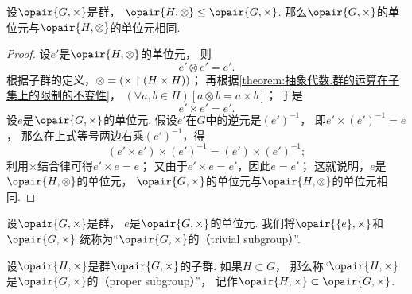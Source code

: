 \begin{proposition}\label{theorem:抽象代数.子群.群的单位元与其子群的单位元相同}
设\(\opair{G,\times}\)是群，
\(\opair{H,\otimes}\AlgebraSubstructure\opair{G,\times}\).
那么\(\opair{G,\times}\)的单位元与\(\opair{H,\otimes}\)的单位元相同.
\begin{proof}
设\(e'\)是\(\opair{H,\otimes}\)的单位元，
则\begin{equation*}
	e' \otimes e' = e'.
\end{equation*}
根据子群的定义，\(\otimes = (\times \upharpoonright(H \times H))\)；
再根据\cref{theorem:抽象代数.群的运算在子集上的限制的不变性}，
\((\forall a,b \in H)[a \otimes b = a \times b]\)；
于是\begin{equation*}
	e' \times e' = e'.
\end{equation*}
设\(e\)是\(\opair{G,\times}\)的单位元.
假设\(e'\)在\(G\)中的逆元是\((e')^{-1}\)，
即\(e' \times (e')^{-1} = e\)，
那么在上式等号两边右乘\((e')^{-1}\)，得\begin{equation*}
	(e' \times e') \times (e')^{-1} = (e') \times (e')^{-1};
\end{equation*}
利用\(\times\)结合律可得\(e' \times e = e\)；
又由于\(e' \times e = e'\)，因此\(e = e'\)；
这就说明，\(e\)是\(\opair{H,\otimes}\)的单位元，
\(\opair{G,\times}\)的单位元与\(\opair{H,\otimes}\)的单位元相同.
\end{proof}
\end{proposition}

\begin{definition}
设\(\opair{G,\times}\)是群，
\(e\)是\(\opair{G,\times}\)的单位元.
我们将\(\opair{\{e\},\times}\)和\(\opair{G,\times}\)
统称为“\(\opair{G,\times}\)的（trivial subgroup）”.
\end{definition}

\begin{definition}
设\(\opair{H,\times}\)是群\(\opair{G,\times}\)的子群.
如果\(H \subset G\)，
那么称“\(\opair{H,\times}\)是\(\opair{G,\times}\)的（proper subgroup）”，
记作\(\opair{H,\times}\subset\opair{G,\times}\).
\end{definition}

